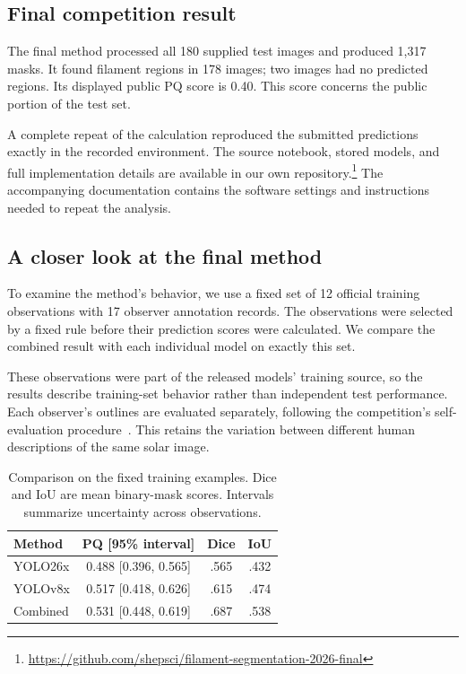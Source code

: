 \documentclass[sigconf]{acmart}
\begin{document}
\subsection{Final competition result}
The final method processed all 180 supplied test images and produced 1,317 masks.
It found filament regions in 178 images; two images had no predicted regions.
Its displayed public PQ score is 0.40. This score concerns the public portion of the test set.


A complete repeat of the calculation reproduced the submitted predictions exactly in the recorded environment.
The source notebook, stored models, and full implementation details are available in our own repository.\footnote{\url{https://github.com/shepsci/filament-segmentation-2026-final}}
The accompanying documentation contains the software settings and instructions needed to repeat the analysis.


\subsection{A closer look at the final method}
To examine the method's behavior, we use a fixed set of 12 official training observations with 17 observer annotation records.
The observations were selected by a fixed rule before their prediction scores were calculated.
We compare the combined result with each individual model on exactly this set.


These observations were part of the released models' training source, so the results describe training-set behavior rather than independent test performance.
Each observer's outlines are evaluated separately, following the competition's self-evaluation procedure~\cite{hosteval}.
This retains the variation between different human descriptions of the same solar image.


\begin{table}[t]
\caption{Comparison on the fixed training examples. Dice and IoU are mean binary-mask scores. Intervals summarize uncertainty across observations.}
\label{tab:diagnostics}
\centering\small
\begin{tabular}{lccc}\toprule
Method & PQ [95\% interval] & Dice & IoU\\\midrule
YOLO26x & 0.488 [0.396, 0.565] & .565 & .432\\
YOLOv8x & 0.517 [0.418, 0.626] & .615 & .474\\
Combined & 0.531 [0.448, 0.619] & .687 & .538\\\bottomrule
\end{tabular}
\end{table}
\end{document}

